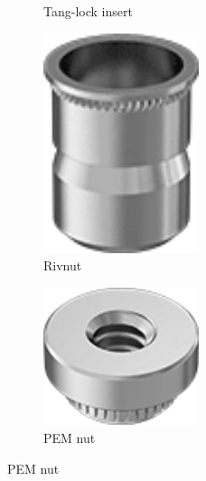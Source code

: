 \documentclass[10pt,letterpaper]{book}
\begin{document}
\begin{figure}[H]
\begin{subfigure}[b]{.24\linewidth}
			\caption{Tang-lock insert}
		\end{subfigure}\begin{subfigure}[b]{.24\linewidth}
			\includegraphics[width=0.5\textwidth]{imgs/rivnut.png}
			\caption{Rivnut}
		\end{subfigure}\begin{subfigure}[b]{.24\linewidth}
			\includegraphics[width=0.5\textwidth]{imgs/pemnut.png}
			\caption{PEM nut}
		\end{subfigure}
		

\end{figure}
\end{document}
